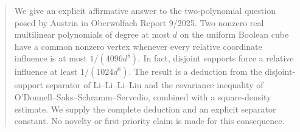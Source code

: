 \begin{abstract}
We give an explicit affirmative answer to the two-polynomial question posed by
Austrin in Oberwolfach Report 9/2025. Two nonzero real multilinear polynomials
of degree at most \(d\) on the uniform Boolean cube have a common nonzero
vertex whenever every relative coordinate influence is at most
\(1/(4096d^8)\). In fact, disjoint supports force a relative influence at least
\(1/(1024d^8)\). The result is a deduction from the disjoint-support separator
of Li--Li--Li--Liu and the covariance inequality of
O'Donnell--Saks--Schramm--Servedio, combined with a square-density estimate.
We supply the complete deduction and an explicit separator constant.
No novelty or first-priority claim is made for this consequence.
\end{abstract}
